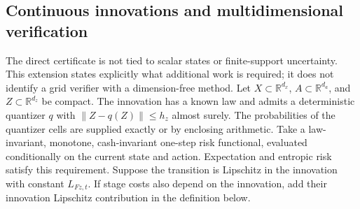\subsection{Continuous innovations and multidimensional verification}
\label{app:r41work}
The direct certificate is not tied to scalar states or finite-support
uncertainty. This extension states explicitly what additional work is
required; it does not identify a grid verifier with a dimension-free
method. Let $X\subset\mathbb R^{d_x}$, $A\subset\mathbb R^{d_a}$, and
$Z\subset\mathbb R^{d_z}$ be compact. The innovation has a known law and
admits a deterministic quantizer $q$ with
$\|Z-q(Z)\|\leq h_z$ almost surely. The probabilities of the quantizer
cells are supplied exactly or by enclosing arithmetic. Take a law-invariant,
monotone, cash-invariant one-step risk functional, evaluated conditionally
on the current state and action. Expectation and entropic risk satisfy this
requirement. Suppose the transition is Lipschitz in the innovation with
constant $L_{Fz,t}$. If stage costs also depend on the innovation, add their
innovation Lipschitz contribution in the definition below.

